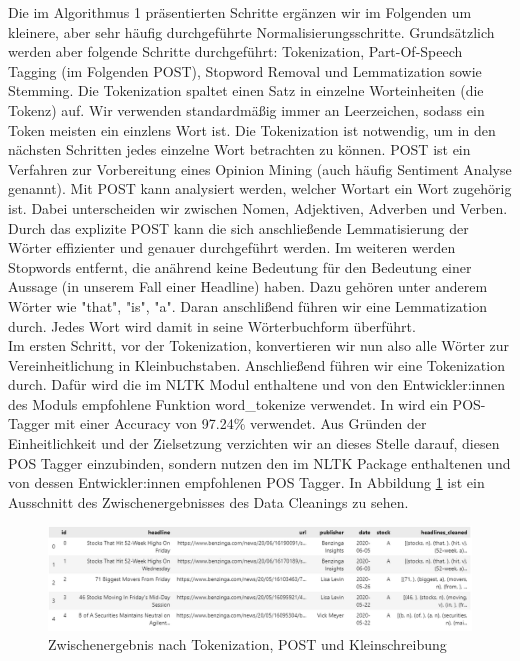 Die im Algorithmus 1 präsentierten Schritte ergänzen wir im Folgenden um kleinere, aber sehr häufig durchgeführte Normalisierungsschritte. Grundsätzlich werden aber folgende Schritte durchgeführt: Tokenization, Part-Of-Speech Tagging (im Folgenden POST), Stopword Removal und Lemmatization sowie Stemming. Die Tokenization spaltet einen Satz in einzelne Worteinheiten (die Tokenz) auf. Wir verwenden standardmäßig immer an Leerzeichen, sodass ein Token meisten ein einzlens Wort ist. Die Tokenization ist notwendig, um in den nächsten Schritten jedes einzelne Wort betrachten zu können. POST ist ein Verfahren zur Vorbereitung eines Opinion Mining (auch häufig Sentiment Analyse genannt). Mit POST kann analysiert werden, welcher Wortart ein Wort zugehörig ist. Dabei unterscheiden wir zwischen Nomen, Adjektiven, Adverben und Verben. Durch das explizite POST kann die sich anschließende Lemmatisierung der Wörter effizienter und genauer durchgeführt werden. Im weiteren werden Stopwords entfernt, die anährend keine Bedeutung für den Bedeutung einer Aussage (in unserem Fall einer Headline) haben. Dazu gehören unter anderem Wörter wie "that", "is", "a". Daran anschlißend führen wir eine Lemmatization durch. Jedes Wort wird damit in seine Wörterbuchform überführt.
\\
Im ersten Schritt, vor der Tokenization, konvertieren wir nun also alle Wörter zur Vereinheitlichung in Kleinbuchstaben. Anschließend führen wir eine Tokenization durch. Dafür wird die im NLTK Modul enthaltene und von den Entwickler:innen des Moduls empfohlene Funktion word\_tokenize verwendet. In \cite{agarwel2016} wird ein POS-Tagger mit einer Accuracy von 97.24\% verwendet. Aus Gründen der Einheitlichkeit und der Zielsetzung verzichten wir an dieses Stelle darauf, diesen POS Tagger einzubinden, sondern nutzen den im NLTK Package enthaltenen und von dessen Entwickler:innen empfohlenen POS Tagger. In Abbildung \ref{Zwischenergebis_1} ist ein Ausschnitt des Zwischenergebnisses des Data Cleanings zu sehen.
\begin{figure}[t]
    \includegraphics[scale=0.54]{img/Ausschnitt_Zwischenergebnis.png}
    \caption{Zwischenergebnis nach Tokenization, POST und Kleinschreibung}
    \label{Zwischenergebis_1}
\end{figure}
